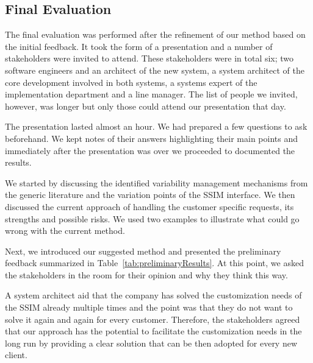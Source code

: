 \subsection{Final Evaluation }
The final evaluation was performed after the refinement of our method based on the initial feedback. It took the form of a presentation and a number of stakeholders were invited to attend. These stakeholders were in total six; two software engineers and an architect of the new system, a system architect of the core development involved in both systems, a systems expert of the implementation department and a line manager. The list of people we invited, however, was longer but only those could attend our presentation that day.

The presentation lasted almost an hour. We had prepared a few questions to ask beforehand. We kept notes of their answers highlighting their main points and immediately after the presentation was over we proceeded to documented the results. 

We started by discussing the identified variability management mechanisms from the generic literature and the variation points of the SSIM interface. We then discussed the current approach of handling the customer specific requests, its strengths and possible risks. We used two examples to illustrate what could go wrong with the current method.

Next, we introduced our suggested method and presented the preliminary feedback summarized in Table~\ref{tab:preliminaryResults}. At this point, we asked the stakeholders in the room for their opinion and why they think this way.



 A system architect aid that the company has solved the customization needs of the SSIM already multiple times and the point was that they do not want to solve it again and again for every customer. Therefore, the stakeholders agreed that our approach has the potential to facilitate the customization needs in the long run by providing a clear solution that can be then adopted for every new client.

